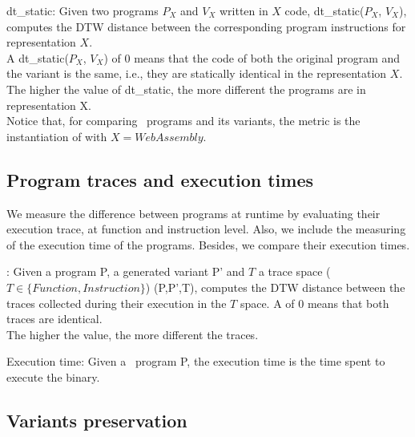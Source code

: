 \begin{metric}{dt\_static:}\label{metric:static1}
	Given two programs $P_X$ and $V_X$ written in $X$ code, dt\_static($P_X$, $V_X$), computes the DTW distance between the corresponding program instructions for representation $X$. \\
	
	A dt\_static($P_X$, $V_X$) of $0$ means that the code of both the original program and the variant is the same, i.e., they are statically identical in the representation $X$. The higher the value of dt\_static, the more different the programs are in representation X. \\

	Notice that, for comparing \wasm\ programs and its variants, the metric is the instantiation of \DTWStatic with $X=WebAssembly$.
\end{metric}

\subsection{Program traces and execution times}

We measure the difference between programs at runtime by evaluating their execution trace, at function and instruction level. Also, we include the measuring of the execution time of the programs. Besides, we compare their execution times.


\begin{metric}{\DTW{}:}\label{metric:stack}
	Given a program P, a \tool generated variant P' and $T$ a trace space ($T \in \{Function, Instruction \}$) \DTW{}(P,P',T), computes the DTW distance between the traces collected during their execution in the $T$ space. A \DTW{} of $0$ means that both traces are identical. \\ 
	
	The higher the value, the more different the traces. 
\end{metric}


\begin{metric}{Execution time:}\label{metric:time}
	Given a \wasm\ program P, the execution time is the time spent to execute the binary.
\end{metric}

\subsection{Variants preservation}

